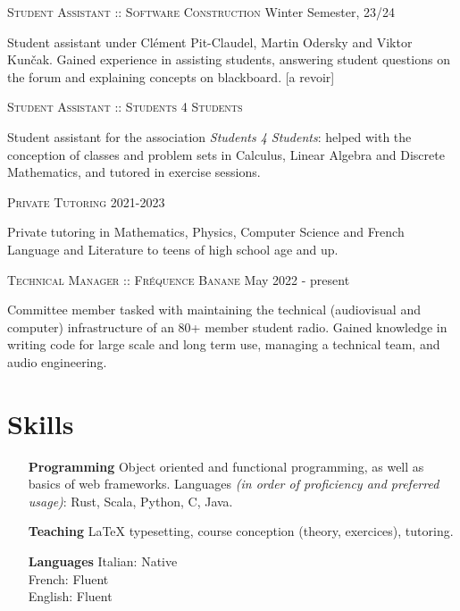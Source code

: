 \documentclass[10pt]{article}
\renewcommand{\line}[2]{{\vspace{4pt} \large \noindent\textsc{#1} \hfill #2}\vspace{4pt}}
\begin{document}
  \line{Student Assistant :: Software Construction}{Winter Semester, 23/24}

  Student assistant under Clément Pit-Claudel, Martin Odersky and Viktor Kunčak. Gained experience in assisting students, answering student questions on the forum and explaining concepts on blackboard. [a revoir]

  \line{Student Assistant :: Students 4 Students}{}

  Student assistant for the association \textit{Students 4 Students}: helped with the conception of classes and problem sets in Calculus, Linear Algebra and Discrete Mathematics, and tutored in exercise sessions.

  \line{Private Tutoring}{2021-2023}

  Private tutoring in Mathematics, Physics, Computer Science and French Language and Literature to teens of high school age and up.

  \line{Technical Manager :: Fréquence Banane}{May 2022 - present}

  Committee member tasked with maintaining the technical (audiovisual and computer) infrastructure of an 80+ member student radio. Gained knowledge in writing code for large scale and long term use, managing a technical team, and audio engineering.

  \section*{Skills}
  
  \begin{adjustwidth}{1in}{}
    \begin{itemize}
      \item[\textbf{Programming}] Object oriented and functional programming, as well as basics of web frameworks. Languages \textit{(in order of proficiency and preferred usage)}: Rust, Scala, Python, C, Java. 
      \item[\textbf{Teaching}] LaTeX typesetting, course conception (theory, exercices), tutoring.
      \item[\textbf{Languages}] Italian: Native \\ French: Fluent \\ English: Fluent
    \end{itemize}
  \end{adjustwidth}
\end{document}
